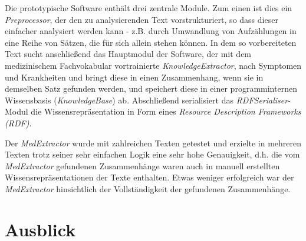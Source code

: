 Die prototypische Software enthält drei zentrale Module. Zum einen ist dies ein \emph{Preprocessor}, der den zu analysierenden Text vorstrukturiert, so dass dieser einfacher analysiert werden kann - z.B. durch Umwandlung von Aufzählungen in eine Reihe von Sätzen, die für sich allein stehen können. In dem so vorbereiteten Text sucht anschließend das Hauptmodul der Software, der mit dem medizinischem Fachvokabular vortrainierte \emph{KnowledgeExtractor}, nach Symptomen und Krankheiten und bringt diese in einen Zusammenhang, wenn sie in demselben Satz gefunden werden, und speichert diese in einer programminternen Wissensbasis (\emph{KnowledgeBase}) ab. Abschließend serialisiert das \emph{RDFSerialiser}-Modul die Wissensrepräsentation in Form eines \emph{Resource Description Frameworks (RDF)}.

Der \emph{MedExtractor} wurde mit zahlreichen Texten getestet und erzielte in mehreren Texten trotz seiner sehr einfachen Logik eine sehr hohe Genauigkeit, d.h. die vom \emph{MedExtractor} gefundenen Zusammenhänge waren auch in manuell erstellten Wissensrepräsentationen der Texte enthalten. Etwas weniger erfolgreich war der \emph{MedExtractor} hinsichtlich der Vollständigkeit der gefundenen Zusammenhänge.


\section{Ausblick}
\label{sec:Ausblick} 